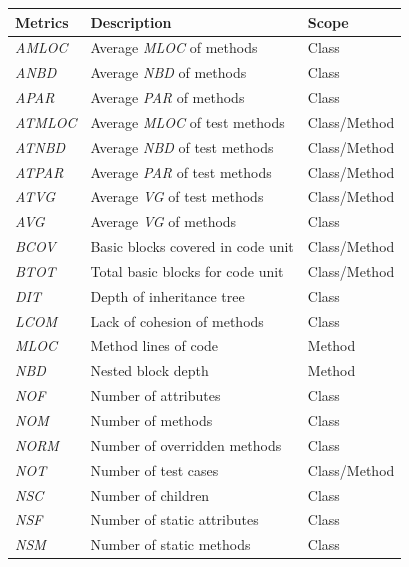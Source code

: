 \begin{table}[!tb]
  \centering
  \begin{threeparttable}
    \begin{tabular}{|l|l|l|}
      \hline
      \rowcolor[RGB]{169,196,223}
      \textbf{Metrics} & \textbf{Description} & \textbf{Scope} \\
      \hline \emph{AMLOC} & Average \emph{MLOC} of methods & Class \\
      \hline \emph{ANBD} & Average \emph{NBD} of methods & Class \\
      \hline \emph{APAR} & Average \emph{PAR} of methods & Class \\
      \hline \emph{ATMLOC} & Average \emph{MLOC} of test methods & Class/Method \\
      \hline \emph{ATNBD} & Average \emph{NBD} of test methods & Class/Method \\
      \hline \emph{ATPAR} & Average \emph{PAR} of test methods & Class/Method \\
      \hline \emph{ATVG} & Average \emph{VG} of test methods & Class/Method \\
      \hline \emph{AVG} & Average \emph{VG} of methods & Class \\
      \hline \emph{BCOV} & Basic blocks covered in code unit & Class/Method \\
      \hline \emph{BTOT} & Total basic blocks for code unit & Class/Method \\
      \hline \emph{DIT} & Depth of inheritance tree & Class \\
      \hline \emph{LCOM} & Lack of cohesion of methods & Class \\
      \hline \emph{MLOC} & Method lines of code & Method \\
      \hline \emph{NBD} & Nested block depth & Method \\
      \hline \emph{NOF} & Number of attributes & Class \\
      \hline \emph{NOM} & Number of methods & Class \\
      \hline \emph{NORM} & Number of overridden methods & Class \\
      \hline \emph{NOT} & Number of test cases & Class/Method \\
      \hline \emph{NSC} & Number of children & Class \\
      \hline \emph{NSF} & Number of static attributes & Class \\
      \hline \emph{NSM} & Number of static methods & Class \\

\end{tabular}
\end{threeparttable}
\end{table}
